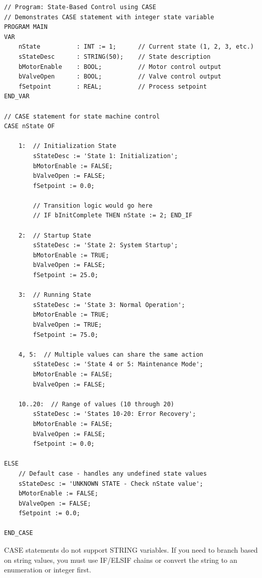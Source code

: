 \documentclass[11pt,a4paper]{article}
\begin{document}
\begin{lstlisting}
// Program: State-Based Control using CASE
// Demonstrates CASE statement with integer state variable
PROGRAM MAIN
VAR
    nState          : INT := 1;      // Current state (1, 2, 3, etc.)
    sStateDesc      : STRING(50);    // State description
    bMotorEnable    : BOOL;          // Motor control output
    bValveOpen      : BOOL;          // Valve control output
    fSetpoint       : REAL;          // Process setpoint
END_VAR

// CASE statement for state machine control
CASE nState OF

    1:  // Initialization State
        sStateDesc := 'State 1: Initialization';
        bMotorEnable := FALSE;
        bValveOpen := FALSE;
        fSetpoint := 0.0;
        
        // Transition logic would go here
        // IF bInitComplete THEN nState := 2; END_IF
        
    2:  // Startup State
        sStateDesc := 'State 2: System Startup';
        bMotorEnable := TRUE;
        bValveOpen := FALSE;
        fSetpoint := 25.0;
        
    3:  // Running State
        sStateDesc := 'State 3: Normal Operation';
        bMotorEnable := TRUE;
        bValveOpen := TRUE;
        fSetpoint := 75.0;
        
    4, 5:  // Multiple values can share the same action
        sStateDesc := 'State 4 or 5: Maintenance Mode';
        bMotorEnable := FALSE;
        bValveOpen := FALSE;
        
    10..20:  // Range of values (10 through 20)
        sStateDesc := 'States 10-20: Error Recovery';
        bMotorEnable := FALSE;
        bValveOpen := FALSE;
        fSetpoint := 0.0;

ELSE
    // Default case - handles any undefined state values
    sStateDesc := 'UNKNOWN STATE - Check nState value';
    bMotorEnable := FALSE;
    bValveOpen := FALSE;
    fSetpoint := 0.0;
    
END_CASE
\end{lstlisting}

\begin{warningbox}
CASE statements do not support STRING variables. If you need to branch based on string values, you must use IF/ELSIF chains or convert the string to an enumeration or integer first.
\end{warningbox}

\end{document}
